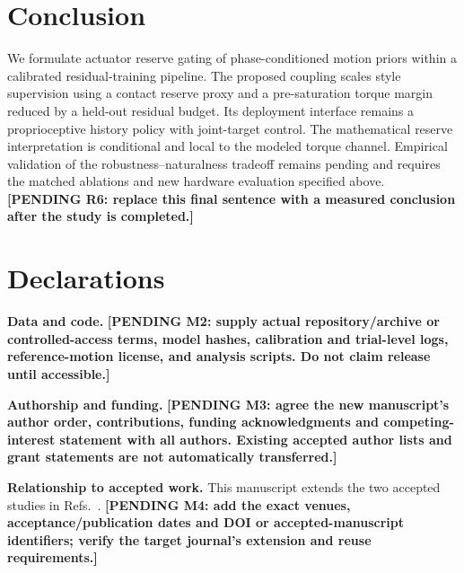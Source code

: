 \documentclass[11pt,a4paper]{article}
\newcommand{\pending}[1]{\textbf{[PENDING #1]}}
\begin{document}
\section{Conclusion}
We formulate actuator reserve gating of phase-conditioned motion priors within a calibrated residual-training pipeline. The proposed coupling scales style supervision using a contact reserve proxy and a pre-saturation torque margin reduced by a held-out residual budget. Its deployment interface remains a proprioceptive history policy with joint-target control. The mathematical reserve interpretation is conditional and local to the modeled torque channel. Empirical validation of the robustness--naturalness tradeoff remains pending and requires the matched ablations and new hardware evaluation specified above. \pending{R6: replace this final sentence with a measured conclusion after the study is completed.}

\section*{Declarations}
\textbf{Data and code.} \pending{M2: supply actual repository/archive or controlled-access terms, model hashes, calibration and trial-level logs, reference-motion license, and analysis scripts. Do not claim release until accessible.}

\textbf{Authorship and funding.} \pending{M3: agree the new manuscript's author order, contributions, funding acknowledgments and competing-interest statement with all authors. Existing accepted author lists and grant statements are not automatically transferred.}

\textbf{Relationship to accepted work.} This manuscript extends the two accepted studies in Refs.~\cite{priorSG,priorRTI}. \pending{M4: add the exact venues, acceptance/publication dates and DOI or accepted-manuscript identifiers; verify the target journal's extension and reuse requirements.}
\end{document}
